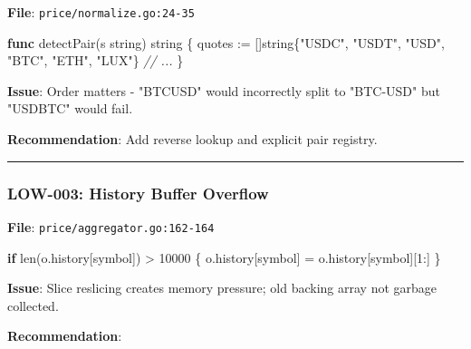 \documentclass[
]{article}
\newenvironment{Shaded}{}{}
\newcommand{\BuiltInTok}[1]{\textcolor[rgb]{0.00,0.50,0.00}{#1}}
\newcommand{\CommentTok}[1]{\textcolor[rgb]{0.38,0.63,0.69}{\textit{#1}}}
\newcommand{\ControlFlowTok}[1]{\textcolor[rgb]{0.00,0.44,0.13}{\textbf{#1}}}
\newcommand{\DataTypeTok}[1]{\textcolor[rgb]{0.56,0.13,0.00}{#1}}
\newcommand{\DecValTok}[1]{\textcolor[rgb]{0.25,0.63,0.44}{#1}}
\newcommand{\KeywordTok}[1]{\textcolor[rgb]{0.00,0.44,0.13}{\textbf{#1}}}
\newcommand{\NormalTok}[1]{#1}
\newcommand{\OperatorTok}[1]{\textcolor[rgb]{0.40,0.40,0.40}{#1}}
\newcommand{\StringTok}[1]{\textcolor[rgb]{0.25,0.44,0.63}{#1}}
\begin{document}
\textbf{File}: \texttt{price/normalize.go:24-35}

\begin{Shaded}
\begin{Highlighting}[]
\KeywordTok{func}\NormalTok{ detectPair}\OperatorTok{(}\NormalTok{s }\DataTypeTok{string}\OperatorTok{)} \DataTypeTok{string} \OperatorTok{\{}
\NormalTok{    quotes }\OperatorTok{:=} \OperatorTok{[]}\DataTypeTok{string}\OperatorTok{\{}\StringTok{"USDC"}\OperatorTok{,} \StringTok{"USDT"}\OperatorTok{,} \StringTok{"USD"}\OperatorTok{,} \StringTok{"BTC"}\OperatorTok{,} \StringTok{"ETH"}\OperatorTok{,} \StringTok{"LUX"}\OperatorTok{\}}
    \CommentTok{// ...}
\OperatorTok{\}}
\end{Highlighting}
\end{Shaded}

\textbf{Issue}: Order matters - "BTCUSD" would incorrectly split to
"BTC-USD" but "USDBTC" would fail.

\textbf{Recommendation}: Add reverse lookup and explicit pair registry.

\begin{center}\rule{0.5\linewidth}{0.5pt}\end{center}

\subsubsection{LOW-003: History Buffer
Overflow}\label{low-003-history-buffer-overflow}

\textbf{File}: \texttt{price/aggregator.go:162-164}

\begin{Shaded}
\begin{Highlighting}[]
\ControlFlowTok{if} \BuiltInTok{len}\OperatorTok{(}\NormalTok{o}\OperatorTok{.}\NormalTok{history}\OperatorTok{[}\NormalTok{symbol}\OperatorTok{])} \OperatorTok{\textgreater{}} \DecValTok{10000} \OperatorTok{\{}
\NormalTok{    o}\OperatorTok{.}\NormalTok{history}\OperatorTok{[}\NormalTok{symbol}\OperatorTok{]} \OperatorTok{=}\NormalTok{ o}\OperatorTok{.}\NormalTok{history}\OperatorTok{[}\NormalTok{symbol}\OperatorTok{][}\DecValTok{1}\OperatorTok{:]}
\OperatorTok{\}}
\end{Highlighting}
\end{Shaded}

\textbf{Issue}: Slice reslicing creates memory pressure; old backing
array not garbage collected.

\textbf{Recommendation}:
\end{document}
